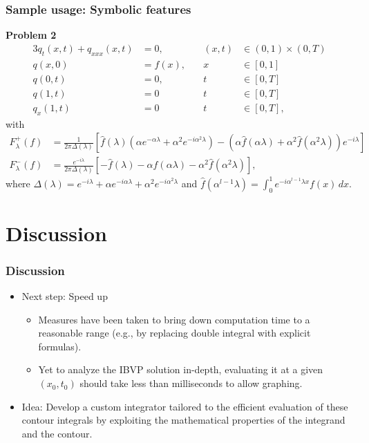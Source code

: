 \documentclass{beamer}
\begin{document}
\begin{frame}
    \frametitle{Sample usage: Symbolic features}
    \textbf{Problem 2}
    \small
    \begin{alignat*}{3}
        q_t(x,t) + q_{xxx}(x,t) &= 0,\quad &(x,t)&\in (0,1)\times (0,T)\\
        q(x,0) &= f(x),\quad &x&\in [0,1]\\
        q(0,t) &= 0, \quad &t&\in [0,T]\\
        q(1,t) &= 0\quad &t&\in [0,T]\\
        q_x(1,t) &= 0 \quad &t&\in [0,T],
        \end{alignat*}
        with
        \begin{align*}
        F_\lambda^+(f) &= \frac{1}{2\pi\Delta(\lambda)}\left[\hat{f}(\lambda)(\alpha e^{-\alpha\lambda} + \alpha^2 e^{-i\alpha^2\lambda}) - (\alpha\hat{f}(\alpha\lambda) + \alpha^2\hat{f}(\alpha^2\lambda))e^{-i\lambda}\right]\\
        F_\lambda^-(f) &= \frac{e^{-i\lambda}}{2\pi\Delta(\lambda)}\left[-\hat{f}(\lambda) - \alpha\hat{f}(\alpha\lambda) - \alpha^2\hat{f}(\alpha^2\lambda)\right],
        \end{align*}
        where $\Delta(\lambda) = e^{-i\lambda} + \alpha e^{-i\alpha\lambda} + \alpha^2e^{-i\alpha^2\lambda}$
        and $\hat{f}(\alpha^{l-1}\lambda) = \int_0^1 e^{-i\alpha^{l-1}\lambda x}f(x)\,dx$.
\end{frame}

\section{Discussion}
\begin{frame}
    \frametitle{Discussion}
    \begin{itemize}\setlength\itemsep{1em}
        \item Next step: Speed up
        \begin{itemize}
            \item Measures have been taken to bring down computation time to a reasonable range (e.g., by replacing double integral with explicit formulas).
            \item Yet to analyze the IBVP solution in-depth, evaluating it at a given $(x_0,t_0)$ should take less than milliseconds to allow graphing.
        \end{itemize}
        \item Idea: Develop a custom integrator tailored to the efficient evaluation of these contour integrals by exploiting the mathematical properties of the integrand and the contour.
    \end{itemize}
\end{frame}
\end{document}
